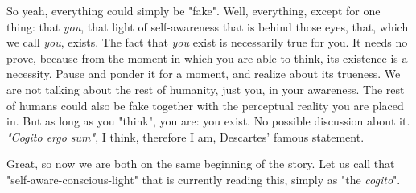 \documentclass[11pt, a4paper]{article} %
\begin{document}
So yeah, everything could simply be "fake". Well, everything, except for one thing: that {\em you}, that light of self-awareness that is behind those eyes, that, which we call {\em you}, exists. The fact that {\em you} exist is necessarily true for you. It needs no prove, because from the moment in which you are able to think, its existence is a necessity. Pause and ponder it for a moment, and realize about its trueness. We are not talking about the rest of humanity, just you, in your awareness. The rest of humans could also be fake together with the perceptual reality you are placed in. But as long as you "think", you are: you exist. No possible discussion about it. {\em "Cogito ergo sum"}, I think, therefore I am, Descartes' famous statement.

Great, so now we are both on the same beginning of the story. Let us call that "self-aware-conscious-light" that is currently reading this, simply as "the {\em cogito}".
\end{document}
